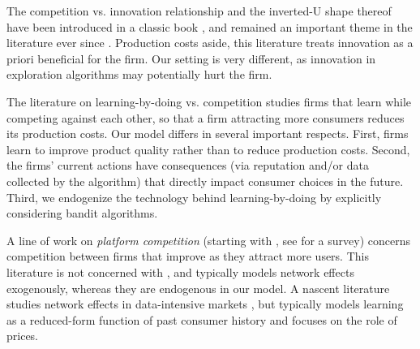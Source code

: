 

 The competition vs. innovation relationship and the inverted-U shape thereof have been introduced in a classic book \citep{Schumpeter-42}, and remained an important theme in the literature ever since \cite[\eg][]{aghion2005competition,Vives-08}. Production costs aside, this literature treats innovation as a priori beneficial for the firm. Our setting is very different, as innovation in exploration algorithms may potentially hurt the firm.

The literature on learning-by-doing vs. competition \citep[\eg][]{fudenberg1983learning, dasgupta1988learning, cabral1994learning} studies firms that learn while competing against each other, so that a firm attracting more consumers reduces its production costs. Our model differs in several important respects. First, firms learn to improve product quality rather than to reduce production costs. Second, the firms' current actions have consequences (via reputation and/or data collected by the algorithm) that directly impact consumer choices in the future. Third, we endogenize the technology behind learning-by-doing by explicitly considering bandit algorithms.


A line of work on \emph{platform competition} (starting with \cite{Rysman09}, see \citet{Weyl-White-14} for a survey) concerns competition between firms that improve as they attract more users. This literature is not concerned with \innovation, and typically models network effects exogenously, whereas they are endogenous in our model.
A nascent literature studies
network effects
in data-intensive markets \citep{prufer2017competing, hagiu2020data}, but typically models learning as a reduced-form function of past consumer history and focuses on the role of prices.

